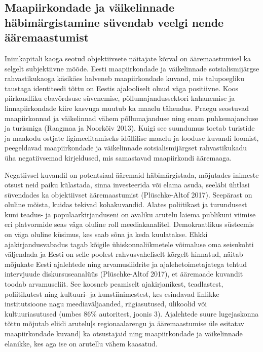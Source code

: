 \documentclass[]{book}
\begin{document}
\hypertarget{maapiirkondade-ja-vaikelinnade-habimargistamine-suvendab-veelgi-nende-aaremaastumist}{%
\subsection{Maapiirkondade ja väikelinnade häbimärgistamine süvendab veelgi nende ääremaastumist}\label{maapiirkondade-ja-vaikelinnade-habimargistamine-suvendab-veelgi-nende-aaremaastumist}}

Inimkapitali kaoga seotud objektiivsete näitajate kõrval on ääremaastumisel ka selgelt subjektiivne mõõde.
Eesti maapiirkondade ja väikelinnade sotsialismijärgse rahvastikukaoga käsikäes halveneb maapiirkondade
kuvand, mis talupoegliku taustaga identiteedi tõttu on Eestis ajalooliselt olnud väga positiivne. Koos
piirkondliku ebavõrdsuse süvenemise, põllumajandussektori kahanemise ja linnapiirkondade kiire kasvuga
muutub ka maaelu tähendus. Praegu seostuvad maapiirkonnad ja väikelinnad vähem põllumajanduse ning
enam puhkemajanduse ja turismiga (Raagmaa ja Noorkõiv 2013). Kuigi see suundumus toetab turistide ja
maakodu ostjate ligimeelitamiseks idüllilise maaelu ja looduse kuvandi loomist, peegeldavad
maapiirkondade ja väikelinnade sotsialismijärgset rahvastikukadu üha negatiivsemad kirjeldused, mis
samastavad maapiirkondi ääremaaga.

Negatiivsel kuvandil on potentsiaal ääremaid häbimärgistada, mõjutades inimeste otsust neid paiku
külastada, sinna investeerida või elama asuda, seeläbi ühtlasi süvendades ka objektiivset ääremaastumist
(Plüschke-Altof 2017). Seepärast on oluline mõista, kuidas tekivad kohakuvandid. Alates poliitikast ja
turundusest kuni teadus- ja populaarkirjanduseni on avaliku arutelu laiema publikuni viimise eri platvormide
seas väga oluline roll meediakanalitel. Demokraatlikus süsteemis on väga oluline küsimus, kes saab sõna ja
keda kuulatakse. Ehkki ajakirjandusvabadus tagab kõigile ühiskonnaliikmetele võimaluse oma seisukohti
väljendada ja Eesti on selle poolest rahvusvaheliselt kõrgelt hinnatud, näitab mõjukate Eesti ajalehtede ning
arvamusliidrite ja ajalehetoimetajatega tehtud intervjuude diskursuseanalüüs (Plüschke-Altof 2017), et
ääremaade kuvandit toodab arvamuseliit. See koosneb peamiselt ajakirjanikest, teadlastest, poliitikutest
ning kultuuri- ja kunstiinimestest, kes esindavad linlikke institutsioone nagu meediaväljaanded, riigiasutused, ülikoolid või kultuuriasutused (umbes 86\% autoritest, joonis 3). Ajalehtede suure lugejaskonna tõttu mõjutab eliidi arutelu{[}s regionaalarengu ja ääremaastumise üle esitatav maapiirkondade kuvand{]} ka otsustajaid ning maapiirkondade ja väikelinnade elanikke, kes aga ise on arutellu vähem kaasatud.
\end{document}
